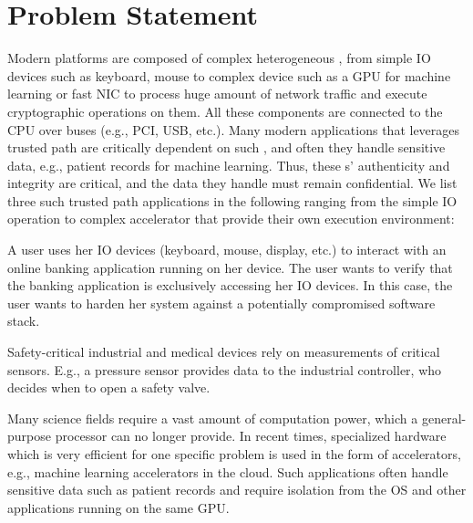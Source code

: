 \section{Problem Statement}
\label{pie:sec:problemStatement}

Modern platforms are composed of complex heterogeneous \sphw, from simple IO devices such as keyboard, mouse to complex device such as a GPU for machine learning or fast NIC to process huge amount of network traffic and execute cryptographic operations on them. All these components are connected to the CPU over buses (e.g., PCI, USB, etc.). Many modern applications that leverages trusted path are critically dependent on such \sphw, and often they handle sensitive data, e.g., patient records for machine learning. Thus, these \sphw{}s' authenticity and integrity are critical, and the data they handle must remain confidential. We list three such trusted path applications in the following ranging from the simple IO operation to complex accelerator that provide their own execution environment:


 A user uses her IO devices (keyboard, mouse, display, etc.) to interact with an online banking application running on her device. The user wants to verify that the banking application is exclusively accessing her IO devices. In this case, the user wants to harden her system against a potentially compromised software stack.

Safety-critical industrial and medical devices rely on measurements of critical sensors. E.g., a pressure sensor provides data to the industrial controller, who decides when to open a safety valve.


Many science fields require a vast amount of computation power, which a general-purpose processor can no longer provide. In recent times, specialized hardware which is very efficient for one specific problem is used in the form of accelerators, e.g., machine learning accelerators in the cloud. Such applications often handle sensitive data such as patient records and require isolation from the OS and other applications running on the same GPU. 

